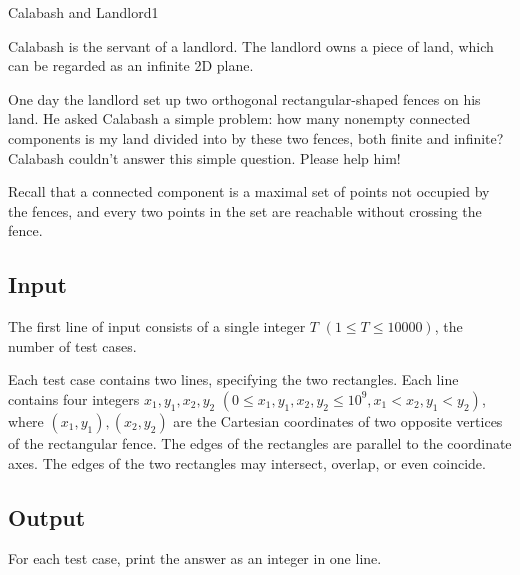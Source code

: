 \begin{Problem}{Calabash and Landlord}{1}

Calabash is the servant of a landlord. The landlord owns a piece of land, which can be regarded as an infinite 2D plane.

One day the landlord set up two orthogonal rectangular-shaped fences on his land. He asked Calabash a simple problem: how many nonempty connected components is my land divided into by these two fences, both finite and infinite? Calabash couldn't answer this simple question. Please help him! 

Recall that a connected component is a maximal set of points not occupied by the fences, and every two points in the set are reachable without crossing the fence.

\subsection*{Input}

The first line of input consists of a single integer $T$ $(1 \leq T \leq 10000)$, the number of test cases. 

Each test case contains two lines, specifying the two rectangles. Each line contains four integers $x_1, y_1, x_2, y_2$ $(0 \leq x_1, y_1, x_2, y_2 \leq 10^9, x_1 < x_2, y_1 < y_2)$, where $(x_1, y_1), (x_2, y_2)$ are the Cartesian coordinates of two opposite vertices of the rectangular fence. The edges of the rectangles are parallel to the coordinate axes. The edges of the two rectangles may intersect, overlap, or even coincide.

\subsection*{Output}

For each test case, print the answer as an integer in one line.


\end{Problem}
